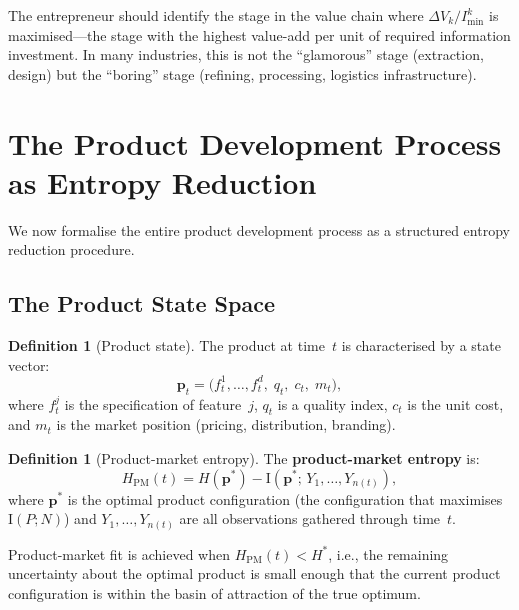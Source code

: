 \documentclass[12pt,a4paper,oneside]{book}
\theoremstyle{definition}
\newtheorem{definition}[theorem]{Definition}
\theoremstyle{remark}
\newcommand{\MI}{\mathrm{I}}
\begin{document}
\begin{practicalimplication}
The entrepreneur should identify the stage in the value chain where $\Delta V_k / I_{\min}^k$
is maximised---the stage with the highest value-add per unit of required information
investment. In many industries, this is not the ``glamorous'' stage (extraction, design)
but the ``boring'' stage (refining, processing, logistics infrastructure).
\end{practicalimplication}

\section{The Product Development Process as Entropy Reduction}\label{sec:product_entropy}

We now formalise the entire product development process as a structured entropy
reduction procedure.

\subsection{The Product State Space}

\begin{definition}[Product state]
The product at time~$t$ is characterised by a state vector:
\begin{equation}\label{eq:product_state}
  \mathbf{p}_t = \bigl(f_t^1, \ldots, f_t^d,\; q_t,\; c_t,\; m_t\bigr),
\end{equation}
where $f_t^j$ is the specification of feature~$j$, $q_t$ is a quality index, $c_t$ is
the unit cost, and $m_t$ is the market position (pricing, distribution, branding).
\end{definition}

\begin{definition}[Product-market entropy]
The \textbf{product-market entropy} is:
\begin{equation}\label{eq:pm_entropy}
  H_{\text{PM}}(t) = H(\mathbf{p}^*) - \MI(\mathbf{p}^*;\, Y_1, \ldots, Y_{n(t)}),
\end{equation}
where $\mathbf{p}^*$ is the optimal product configuration (the configuration that
maximises $\MI(P; N)$) and $Y_1, \ldots, Y_{n(t)}$ are all observations gathered
through time~$t$.
\end{definition}

Product-market fit is achieved when $H_{\text{PM}}(t) < H^*$, i.e., the remaining
uncertainty about the optimal product is small enough that the current product
configuration is within the basin of attraction of the true optimum.
\end{document}
